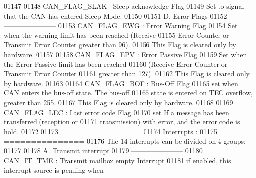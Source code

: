 \begin{DoxyCode}
01147 \textcolor{comment}{        }
01148 \textcolor{comment}{        CAN\_FLAG\_SLAK   : Sleep acknowledge Flag}
01149 \textcolor{comment}{                          Set to signal that the CAN has entered Sleep Mode. }
01150 \textcolor{comment}{    }
01151 \textcolor{comment}{  D. Error Flags}
01152 \textcolor{comment}{  ----------------------- }
01153 \textcolor{comment}{        CAN\_FLAG\_EWG    : Error Warning Flag}
01154 \textcolor{comment}{                          Set when the warning limit has been reached (Receive }
01155 \textcolor{comment}{                          Error Counter or Transmit Error Counter greater than 96). }
01156 \textcolor{comment}{                          This Flag is cleared only by hardware.}
01157 \textcolor{comment}{                            }
01158 \textcolor{comment}{        CAN\_FLAG\_EPV    : Error Passive Flag}
01159 \textcolor{comment}{                          Set when the Error Passive limit has been reached }
01160 \textcolor{comment}{                          (Receive Error Counter or Transmit Error Counter }
01161 \textcolor{comment}{                          greater than 127).}
01162 \textcolor{comment}{                          This Flag is cleared only by hardware.}
01163 \textcolor{comment}{                             }
01164 \textcolor{comment}{        CAN\_FLAG\_BOF    : Bus-Off Flag}
01165 \textcolor{comment}{                          set when CAN enters the bus-off state. The bus-off }
01166 \textcolor{comment}{                          state is entered on TEC overflow, greater than 255.}
01167 \textcolor{comment}{                          This Flag is cleared only by hardware.}
01168 \textcolor{comment}{                                   }
01169 \textcolor{comment}{        CAN\_FLAG\_LEC    : Last error code Flag}
01170 \textcolor{comment}{                          set If a message has been transferred (reception or}
01171 \textcolor{comment}{                          transmission) with error, and the error code is hold.              }
01172 \textcolor{comment}{                          }
01173 \textcolor{comment}{  ===============  }
01174 \textcolor{comment}{   Interrupts :}
01175 \textcolor{comment}{  ===============}
01176 \textcolor{comment}{  The 14 interrupts can be divided on 4 groups: }
01177 \textcolor{comment}{  }
01178 \textcolor{comment}{   A. Transmit interrupt}
01179 \textcolor{comment}{  -----------------------   }
01180 \textcolor{comment}{          CAN\_IT\_TME   :  Transmit mailbox empty Interrupt}
01181 \textcolor{comment}{                          if enabled, this interrupt source is pending when }

\end{DoxyCode}
